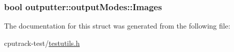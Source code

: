 \subsubsection[{\texorpdfstring{Images}{Images}}]{\setlength{\rightskip}{0pt plus 5cm}bool outputter\+::output\+Modes\+::\+Images}\hypertarget{structoutputter_1_1output_modes_a94bd7bdd78652c810d530372b124665d}{}\label{structoutputter_1_1output_modes_a94bd7bdd78652c810d530372b124665d}


The documentation for this struct was generated from the following file\+:\begin{DoxyCompactItemize}
\item 
cputrack-\/test/\hyperlink{testutils_8h}{testutils.\+h}\end{DoxyCompactItemize}
